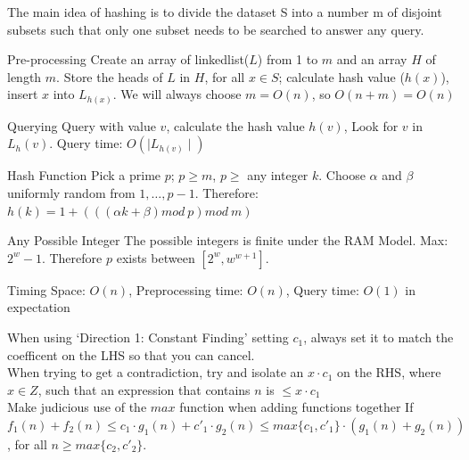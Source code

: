 \documentclass{lecture}
\begin{document}
\begin{landscape}
\begin{multicols}{2}
    \begin{note}{}
        The main idea of hashing is to divide the dataset S into a number m of disjoint subsets such that only one subset needs to be searched to answer any query.
    \end{note}
    \vfill
    \begin{note}{Pre-processing}
        Create an array of linkedlist($L$) from 1 to $m$ and an array $H$ of length $m$. Store the heads of $L$ in $H$, for all $x\in S$; calculate hash value ($h(x)$), insert $x$ into $L_{h(x)}$. We will always choose $m=O(n)$, so $O(n+m)=O(n)$
    \end{note}
    \vfill
    \begin{note}{Querying}
        Query with value $v$, calculate the hash value $h(v)$, Look for $v$ in $L_h(v)$. Query time: $O(\mid L_{h(v)}\mid)$
    \end{note}
    \vfill
    \begin{note}{Hash Function}
        Pick a prime $p$; $p\geq m$, $p\geq$ any integer $k$. Choose $\alpha$ and $\beta$ uniformly random from $1,\ldots,p-1$. Therefore: $h(k)=1+(((\alpha k+\beta)mod\ p)mod\ m)$
    \end{note}
    \vfill
    \begin{note}{Any Possible Integer}
        The possible integers is finite under the RAM Model. Max: $2^w-1$. Therefore $p$ exists between $[2^w,w^{w+1}]$.
    \end{note}
    \vfill
    \begin{note}{Timing}
        Space: $O(n)$, Preprocessing time: $O(n)$, Query time: $O(1)$ in expectation
    \end{note}
    \vfill

    \begin{note}{}
        When using `Direction 1: Constant Finding' setting $c_1$, always set it to match the coefficent on the LHS so that you can cancel.\\
        When trying to get a contradiction, try and isolate an $x \cdot c_1$ on the RHS, where $x \in Z$, such that an expression that contains $n$ is $\leq x \cdot c_1$\\
        Make judicious use of the $max$ function when adding functions together
        If $f_1(n) + f_2(n) \leq c_1 \cdot g_1(n) +c'_1 \cdot g_2(n) \leqslant max\{c_1 , c'_1 \} \cdot (g_1(n) + g_2(n))$, for all $n \geqslant max\{c_2, c'_2\}$.\\
    \end{note}
    \vfill


\end{multicols}
\end{landscape}
\end{document}
